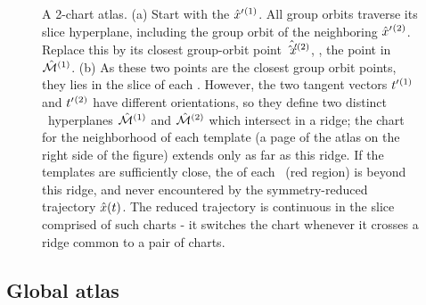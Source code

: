 \begin{figure}
\begin{center}
{} %
 \end{center}
 \caption{\label{fig:A29-2slices}
A 2-chart atlas.
(a)
Start with the {\template} ${\hat{x}'}{}^{(1)}$. All group orbits traverse
its slice hyperplane, including the group orbit of the neighboring
{\template} ${\hat{x}'}{}^{(2)}$. Replace this {\template} by its closest
group-orbit point $\hat{{\hat{x}'}{}}^{(2)}$, \ie, the point in \slice\
$\hat{\cal M}{}^{(1)}$.
(b)
As these two points are the closest group orbit points, they lies in the
slice of each \template. However, the two tangent vectors
$t'_{}{}^{(1)}$ and $t'_{}{}^{(2)}$ have different
orientations, so they define two distinct \slice\ hyperplanes
$\hat{\cal M}{}^{(1)}$ and $\hat{\cal M}{}^{(2)}$ which intersect in a ridge; the
chart for the neighborhood of each template (a page of the atlas on the
right side of the figure) extends only as far as this ridge. If the
templates are sufficiently close, the {\chartBord} of each \slice\ (red
region) is beyond this ridge, and never encountered by the
symmetry-reduced trajectory $\hat{x}(t)$. The reduced trajectory is
continuous in the slice comprised of such charts - it switches the chart
whenever it crosses a ridge common to a pair of charts.
 }
 \end{figure}


\subsection{Global atlas}

